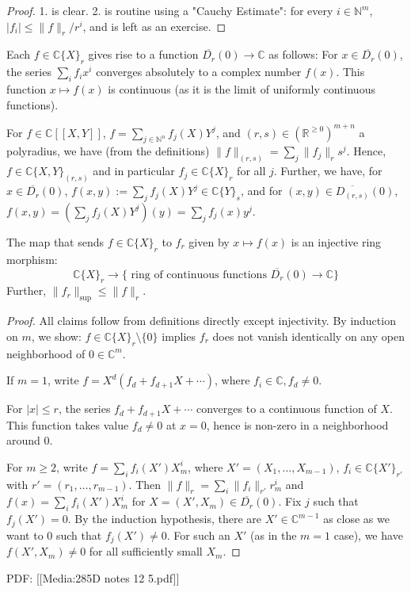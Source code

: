 \begin{proof} %
1. is clear. 2. is routine using a "Cauchy Estimate": for every $i\in \mathbb{N}^m$, $|f_i|\leq \|f\|_r/r^i$,
and is left as an exercise.
 \end{proof}

Each $f\in\mathbb{C}\{X\}_r$ gives rise to a function $\overline{D_r}(0)\rightarrow\mathbb{C}$ as follows:
For $x\in\overline{D_r}(0)$, the series $\sum_i f_i x^i$ converges absolutely to a complex number $f(x)$.
This function $x\mapsto f(x)$ is continuous (as it is the limit of uniformly continuous functions).

For $f\in \mathbb{C}[[X,Y]]$, $f = \sum_{j\in \mathbb{N}^n} f_j(X) Y^j$, 
and $(r,s)\in (\mathbb{R}^{\geq 0})^{m+n}$ a polyradius, we have (from the definitions)
$\|f\|_{(r,s)} = \sum_j \|f_j\|_r s^j$.
Hence, $f\in \mathbb{C}\{X,Y\}_{(r,s)}$ and in particular $f_j\in \mathbb{C}\{X\}_r$ for all $j$.
Further, we have,
for $x\in \overline{D_r}(0)$, $f(x,y):= \sum_j f_j(X)Y^j\in \mathbb{C}\{Y\}_s$,
and for $(x,y)\in \overline{D_{(r,s)}}(0)$, $f(x,y) = \left( \sum_j f_j(X)Y^j\right)(y) = \sum_j f_j(x)y^j$.

\begin{lemma} %

The map that sends $f\in \mathbb{C}\{X\}_r$ to $f_r$ given by $x\mapsto f(x)$ is an injective ring morphism:
$$\mathbb{C}\{X\}_r \rightarrow \{\textrm{ ring of continuous functions } \overline{D_r}(0) \rightarrow \mathbb{C}\}$$
Further, $\|f_r\|_{\mathrm{sup}} \leq \|f\|_r$.
 \end{lemma}

\begin{proof} %

All claims follow from definitions directly except injectivity. By induction on $m$, we show:
$f\in \mathbb{C}\{X\}_r\setminus \{0\}$ implies $f_r$ does not vanish identically on any open neighborhood of $0\in \mathbb{C}^m$.

If $m=1$, write $f = X^d (f_d + f_{d+1} X + \cdots )$, where $f_i\in \mathbb{C}, f_d\neq 0$.

For $|x|\leq r$, the series $f_d + f_{d+1}X + \cdots $ converges to a continuous function of $X$.
This function takes value $f_d\neq 0$ at $x=0$, hence is non-zero in a neighborhood around $0$.

For $m\geq 2$, write $f = \sum_i f_i(X') X_m^i$, where $X' = (X_1,\ldots, X_{m-1})$, $f_i \in \mathbb{C}\{X'\}_{r'}$
with $r' = (r_1,\ldots, r_{m-1})$.
Then $\|f\|_r = \sum_i \|f_i\|_{r'} r_m^i$ and $f(x) = \sum_i f_i(X')X_m^i$ for $X = (X',X_m)\in \overline{D_r}(0)$.
Fix $j$ such that $f_j(X') = 0$. By the induction hypothesis, there are $X'\in \mathbb{C}^{m-1}$ as close as we want to $0$
such that $f_j(X')\neq 0$. For such an $X'$ (as in the $m=1$ case), we have $f(X',X_m)\neq 0$ for all sufficiently small $X_m$.
 \end{proof}




PDF: [[Media:285D notes 12 5.pdf]]
